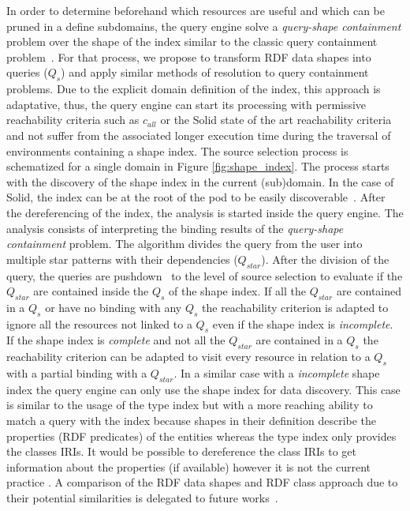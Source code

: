 In order to determine beforehand which resources are useful and which can be pruned in a define subdomains, the query engine solve a \emph{query-shape containment} problem over the shape of the index similar to the classic query containment problem~\cite{afariQCE, Spasi2023}.
For that process, we propose to transform RDF data shapes into queries ($Q_{s}$) \cite{labragayo2017validating, Corman2019, Delva2021} and apply similar methods of resolution to query containment problems.
Due to the explicit domain definition of the index, this approach is adaptative, 
thus, the query engine can start its processing with permissive reachability criteria
such as $c_{all}$ \cite{Hartig2012} or the Solid state of the art reachability criteria \cite{Taelman2023}
and not suffer from the associated longer execution time during the traversal of environments containing a shape index.
The source selection process is schematized for a single domain in Figure \ref{fig:shape_index}.
The process starts with the discovery of the shape index in the current (sub)domain.
In the case of Solid, the index can be at the root of the pod to be easily discoverable~.
After the dereferencing of the index, the analysis is started inside the query engine.
The analysis consists of interpreting the binding results of the \emph{query-shape containment} problem.
The algorithm divides the query from the user into multiple star patterns with their dependencies ($Q_{star}$).
After the division of the query, the queries are pushdown~\cite{Yang2021FlexPushdownDBHP} to the level of source selection to evaluate if the $Q_{star}$ are contained inside the $Q_s$ of the shape index.
If all the $Q_{star}$ are contained in a $Q_{s}$ or have no binding with any $Q_{s}$
the reachability criterion is adapted to ignore all the resources not linked to a $Q_{s}$ even if the shape index is \emph{incomplete}.
If the shape index is \emph{complete} and not all the $Q_{star}$ are contained in a $Q_{s}$ the reachability criterion can be adapted
to visit every resource in relation to a $Q_{s}$ with a partial binding with a $Q_{star}$.
In a similar case with a \emph{incomplete} shape index the query engine can only use the shape index for data discovery.
This case is similar to the usage of the type index but with a more reaching ability to match a query with the index  because shapes in their definition describe the properties (RDF predicates) of the entities whereas the type index only provides the classes IRIs.
It would be possible to dereference the class IRIs to get information about the properties (if available) however it is not the current practice \cite{Taelman2023}.
A comparison of the RDF data shapes and RDF class approach due to their potential similarities is delegated to future works~.

